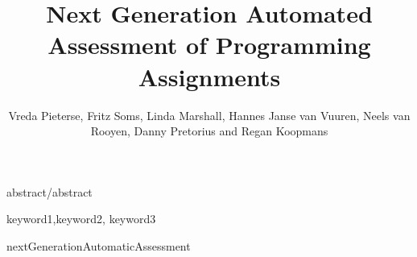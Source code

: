 \documentclass[journal]{IEEEtran}
\begin{document}
\title{Next Generation Automated Assessment of Programming Assignments}

\author{Vreda Pieterse, Fritz Soms, Linda Marshall, Hannes Janse van Vuuren, Neels van Rooyen, Danny Pretorius and Regan Koopmans}%
        
  \maketitle
  
{abstract/abstract}

\begin{IEEEkeywords}
keyword1,keyword2, keyword3
\end{IEEEkeywords}

{nextGenerationAutomaticAssessment}



\end{document}
